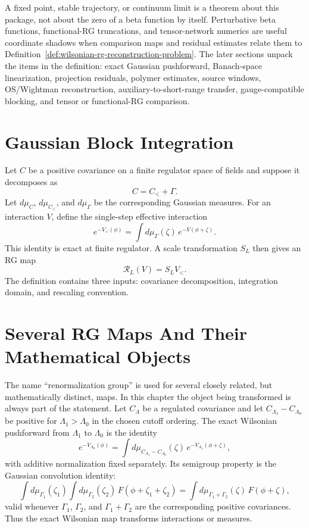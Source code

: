 A fixed point, stable trajectory, or continuum limit is a theorem about this
package, not about the zero of a beta function by itself.  Perturbative beta
functions, functional-RG truncations, and tensor-network numerics are useful
coordinate shadows when comparison maps and residual estimates relate them to
Definition~\ref{def:wilsonian-rg-reconstruction-problem}.  The later sections
unpack the items in the definition: exact Gaussian pushforward, Banach-space
linearization, projection residuals, polymer estimates, source windows,
OS/Wightman reconstruction, auxiliary-to-short-range transfer, gauge-compatible
blocking, and tensor or functional-RG comparison.

\section{Gaussian Block Integration}

Let \(C\) be a positive covariance on a finite regulator space of fields and
suppose it decomposes as
\[
  C=C_<+\Gamma .
\]
Let \(d\mu_C\), \(d\mu_{C_<}\), and \(d\mu_\Gamma\) be the corresponding
Gaussian measures.  For an interaction \(V\), define the single-step
effective interaction
\[
  e^{-V_<(\phi)}
  =
  \int d\mu_\Gamma(\zeta)\,e^{-V(\phi+\zeta)} .
\]
This identity is exact at finite regulator.  A scale transformation \(S_L\)
then gives an RG map
\[
  \mathcal R_L(V)=S_L V_< .
\]
The definition contains three inputs: covariance decomposition, integration
domain, and rescaling convention.

\section{Several RG Maps And Their Mathematical Objects}

The name ``renormalization group'' is used for several closely related, but
mathematically distinct, maps.  In this chapter the object being transformed
is always part of the statement.  Let \(C_\Lambda\) be a regulated covariance
and let \(C_{\Lambda_1}-C_{\Lambda_0}\) be positive for
\(\Lambda_1>\Lambda_0\) in the chosen cutoff ordering.  The exact Wilsonian
pushforward from \(\Lambda_1\) to \(\Lambda_0\) is the identity
\begin{equation}
  e^{-V_{\Lambda_0}(\phi)}
  =
  \int d\mu_{C_{\Lambda_1}-C_{\Lambda_0}}(\zeta)\,
  e^{-V_{\Lambda_1}(\phi+\zeta)} ,
  \label{eq:exact-wilsonian-pushforward-comparison}
\end{equation}
with additive normalization fixed separately.  Its semigroup property is the
Gaussian convolution identity:
\begin{equation}
  \int d\mu_{\Gamma_1}(\zeta_1)
  \int d\mu_{\Gamma_2}(\zeta_2)\,
  F(\phi+\zeta_1+\zeta_2)
  =
  \int d\mu_{\Gamma_1+\Gamma_2}(\zeta)\,
  F(\phi+\zeta),
  \label{eq:gaussian-convolution-semigroup-rg}
\end{equation}
valid whenever \(\Gamma_1\), \(\Gamma_2\), and
\(\Gamma_1+\Gamma_2\) are the corresponding positive covariances.  Thus the
exact Wilsonian map transforms interactions or measures.

